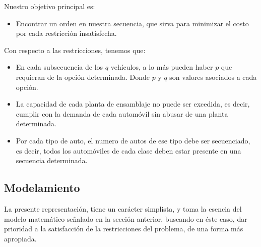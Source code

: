 Nuestro objetivo principal es:
\begin{itemize}
	\item Encontrar un orden en nuestra secuencia, que sirva para minimizar el costo por cada restricción insatisfecha.
\end{itemize}

Con respecto a las restricciones, tenemos que:
\begin{itemize}
	\item En cada subsecuencia de los $q$ vehículos, a lo más pueden haber $p$ que requieran de la opción determinada.
		Donde $p$ y $q$ son valores asociados a cada opción.
	\item La capacidad de cada planta de ensamblaje no puede ser excedida, es decir, cumplir con la demanda de cada automóvil
		sin abusar de una planta determinada.
	\item Por cada tipo de auto, el numero de autos de ese tipo debe ser secuenciado, es decir, todos los automóviles de cada clase
		deben estar presente en una secuencia determinada.
\end{itemize}

\subsection{Modelamiento}

La presente representación, tiene un carácter simplista, y toma la esencia del modelo
matemático señalado en la sección anterior, buscando en éste caso, dar prioridad a la satisfacción
de la restricciones del problema, de una forma más apropiada.

